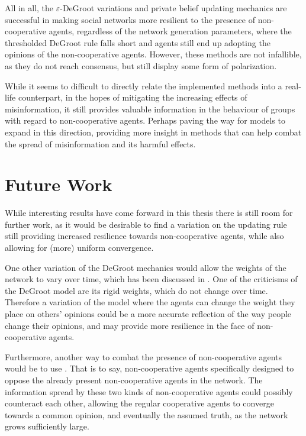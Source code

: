 \documentclass[a4paper, 12pt]{report}
\begin{document}
\noindent All in all, the $\varepsilon$-DeGroot variations and private belief updating mechanics are successful in making social networks more resilient to the presence of non-cooperative agents, regardless of the network generation parameters, where the thresholded DeGroot rule falls short and agents still end up adopting the opinions of the non-cooperative agents. However, these methods are not infallible, as they do not reach consensus, but still display some form of polarization.

\noindent While it seems to difficult to directly relate the implemented methods into a real-life counterpart, in the hopes of mitigating the increasing effects of misinformation, it still provides valuable information in the behaviour of groups with regard to non-cooperative agents. Perhaps paving the way for models to expand in this direction, providing more insight in methods that can help combat the spread of misinformation and its harmful effects.

\newpage

\section{Future Work}

While interesting results have come forward in this thesis there is still room for further work, as it would be desirable to find a variation on the updating rule still providing increased resilience towards non-cooperative agents, while also allowing for (more) uniform convergence.

\noindent One other variation of the DeGroot mechanics would allow the weights of the network to vary over time, which has been discussed in \parencite{chatterjee1977stochastic}. One of the criticisms of the DeGroot model are its rigid weights, which do not change over time. Therefore a variation of the model where the agents can change the weight they place on others' opinions could be a more accurate reflection of the way people change their opinions, and may provide more resilience in the face of non-cooperative agents.

\noindent Furthermore, another way to combat the presence of non-cooperative agents would be to use . That is to say, non-cooperative agents specifically designed to oppose the already present non-cooperative agents in the network. The information spread by these two kinds of non-cooperative agents could possibly counteract each other, allowing the regular cooperative agents to converge towards a common opinion, and eventually the assumed truth, as the network grows sufficiently large.
\end{document}
